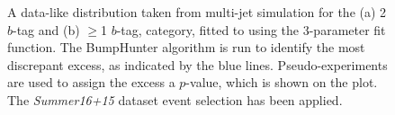 \begin{figure}[!ht]
  \begin{center}
   \captionsetup[subfigure]{aboveskip=0pt,justification=centering}
  \end{center}
  \caption{A data-like distribution taken from multi-jet simulation for the (a) 2 $b$-tag and (b) $\geq$1 $b$-tag,
    category, fitted to using the 3-parameter fit function.
    The BumpHunter algorithm is run to identify the most discrepant excess, as indicated by the blue lines.
    Pseudo-experiments are used to assign the excess a $p$-value, which is shown on the plot.
    The \textit{Summer16+15} dataset event selection has been applied.}
  \label{fig:DataLikeSearchPhase}
\end{figure}

